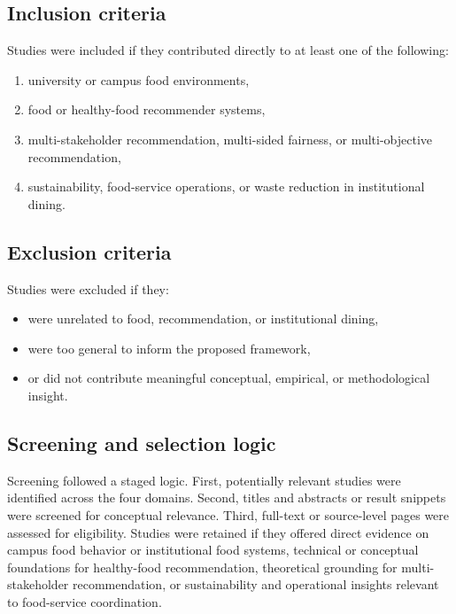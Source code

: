 \subsection{Inclusion criteria}\label{inclusion-criteria}

Studies were included if they contributed directly to at least one of
the following:

\begin{enumerate}
\def\labelenumi{\arabic{enumi}.}
\tightlist
\item
  university or campus food environments,
\item
  food or healthy-food recommender systems,
\item
  multi-stakeholder recommendation, multi-sided fairness, or
  multi-objective recommendation,
\item
  sustainability, food-service operations, or waste reduction in
  institutional dining.
\end{enumerate}

\subsection{Exclusion criteria}\label{exclusion-criteria}

Studies were excluded if they:

\begin{itemize}
\tightlist
\item
  were unrelated to food, recommendation, or institutional dining,
\item
  were too general to inform the proposed framework,
\item
  or did not contribute meaningful conceptual, empirical, or
  methodological insight.
\end{itemize}

\subsection{Screening and selection
logic}\label{screening-and-selection-logic}

Screening followed a staged logic. First, potentially relevant studies
were identified across the four domains. Second, titles and abstracts or
result snippets were screened for conceptual relevance. Third, full-text
or source-level pages were assessed for eligibility. Studies were
retained if they offered direct evidence on campus food behavior or
institutional food systems, technical or conceptual foundations for
healthy-food recommendation, theoretical grounding for multi-stakeholder
recommendation, or sustainability and operational insights relevant to
food-service coordination.

